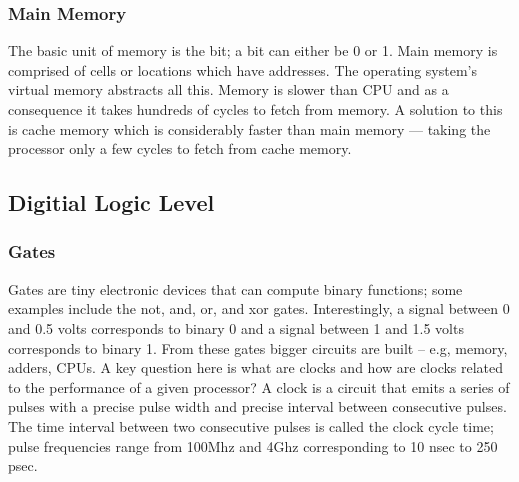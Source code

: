 \documentclass[10pt]{article}
\begin{document}
\subsubsection{Main Memory}
The basic unit of memory is the bit; a bit can either be 0 or 1. Main memory is comprised of cells or locations which have addresses. The operating system's virtual memory abstracts all this. Memory is slower than CPU and as a consequence it takes hundreds of cycles to fetch from memory. A solution to this is cache memory which is considerably faster than main memory --- taking the processor only a few cycles to fetch from cache memory.

\subsection{Digitial Logic Level}
\subsubsection{Gates}
Gates are tiny electronic devices that can compute binary functions; some examples include the not, and, or, and xor gates. Interestingly, a signal between 0 and 0.5 volts corresponds to binary 0 and a signal between 1 and 1.5 volts corresponds to binary 1. From these gates bigger circuits are built -- e.g, memory, adders, CPUs. A key question here is what are clocks and how are clocks related to the performance of a given processor? A clock is a circuit that emits a series of pulses with a precise pulse width and precise interval between consecutive pulses. The time interval between two consecutive pulses is called the clock cycle time; pulse frequencies range from 100Mhz and 4Ghz corresponding to 10 nsec to 250 psec.
\end{document}
